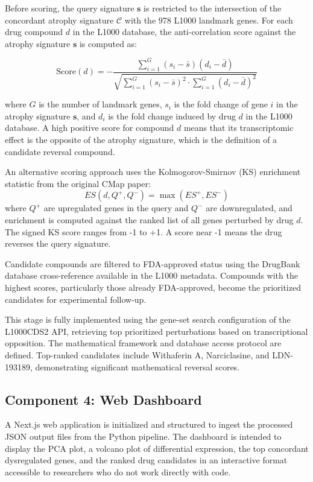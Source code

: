\documentclass[conference]{IEEEtran}
\begin{document}
Before scoring, the query signature $\mathbf{s}$ is restricted to the intersection of the concordant atrophy signature $\mathcal{C}$ with the 978 L1000 landmark genes. For each drug compound $d$ in the L1000 database, the anti-correlation score against the atrophy signature $\mathbf{s}$ is computed as:

\begin{equation}
\text{Score}(d) = -\frac{\displaystyle\sum_{i=1}^{G}(s_i - \bar{s})(d_i - \bar{d})}
{\displaystyle\sqrt{\sum_{i=1}^{G}(s_i - \bar{s})^2 \cdot \sum_{i=1}^{G}(d_i - \bar{d})^2}}
\label{eq:cmap}
\end{equation}

where $G$ is the number of landmark genes, $s_i$ is the fold change of gene $i$ in the atrophy signature $\mathbf{s}$, and $d_i$ is the fold change induced by drug $d$ in the L1000 database. A high positive score for compound $d$ means that its transcriptomic effect is the opposite of the atrophy signature, which is the definition of a candidate reversal compound.

An alternative scoring approach uses the Kolmogorov-Smirnov (KS) enrichment statistic from the original CMap paper:
\begin{equation}
ES(d, Q^+, Q^-) = \max(ES^+, ES^-)
\label{eq:ks_score}
\end{equation}
where $Q^+$ are upregulated genes in the query and $Q^-$ are downregulated, and enrichment is computed against the ranked list of all genes perturbed by drug $d$. The signed KS score ranges from -1 to +1. A score near -1 means the drug reverses the query signature.

Candidate compounds are filtered to FDA-approved status using the DrugBank database cross-reference available in the L1000 metadata. Compounds with the highest scores, particularly those already FDA-approved, become the prioritized candidates for experimental follow-up.

This stage is fully implemented using the gene-set search configuration of the L1000CDS2 API, retrieving top prioritized perturbations based on transcriptional opposition. The mathematical framework and database access protocol are defined. Top-ranked candidates include Withaferin A, Narciclasine, and LDN-193189, demonstrating significant mathematical reversal scores.

\subsection{Component 4: Web Dashboard}
A Next.js web application is initialized and structured to ingest the processed JSON output files from the Python pipeline. The dashboard is intended to display the PCA plot, a volcano plot of differential expression, the top concordant dysregulated genes, and the ranked drug candidates in an interactive format accessible to researchers who do not work directly with code.
\end{document}
